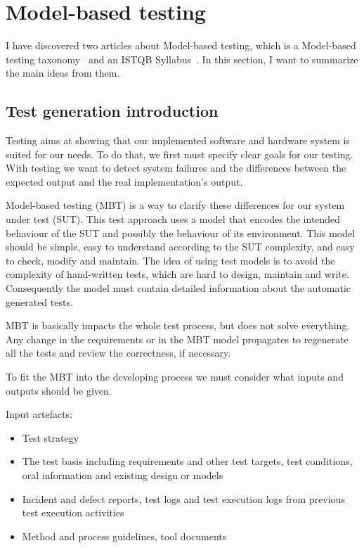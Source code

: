 \chapter{Model-based testing}
I have discovered two articles about Model-based testing, which is a Model-based testing taxonomy~\cite{Taxonomy} and an ISTQB Syllabus~\cite{Syllabus}. In this section, I want to summarize the main ideas from them.

\section{Test generation introduction}
Testing aims at showing that our implemented software and hardware system is suited for our needs. To do that, we first must specify clear goals for our testing. With testing we want to detect system failures and the differences between the expected output and the real implementation's output.

Model-based testing (MBT) is a way to clarify these differences for our system under test (SUT). This test approach uses a model that encodes the intended behaviour of the SUT and possibly the behaviour of its environment. This model should be simple, easy to understand according to the SUT complexity, and easy to check, modify and maintain.
The idea of using test models is to avoid the complexity of hand-written tests, which are hard to design, maintain and write. Consequently the model must contain detailed information about the automatic generated tests. 

MBT is basically impacts the whole test process, but does not solve everything. Any change in the requirements or in the MBT model propagates to regenerate all the tests and review the correctness, if necessary.

To fit the MBT into the developing process we must consider what inputs and outputs should be given.

Input artefacts:
\begin{itemize}
	\item Test strategy
	\item  The test basis including requirements and other test targets, test conditions, oral information and existing design or models
	\item  Incident and defect reports, test logs and test execution logs from previous test execution activities
	\item  Method and process guidelines, tool documents
\end{itemize}


